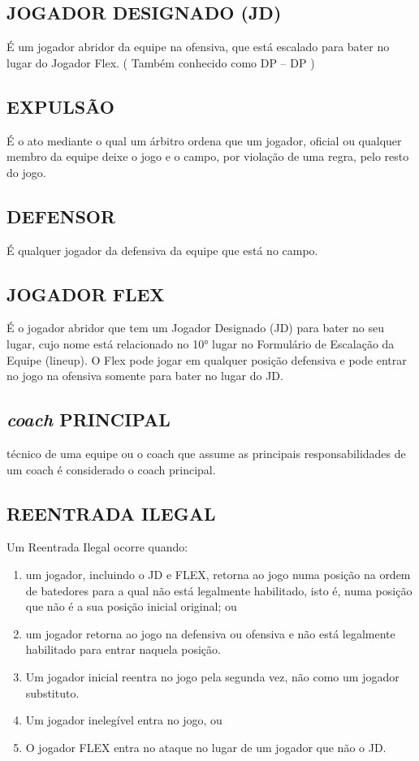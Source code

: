 \subsection{JOGADOR DESIGNADO (JD)}
É um jogador abridor da equipe na ofensiva, que está escalado para bater no lugar do Jogador Flex. ( Também conhecido como DP -- \gls{DP} )

\subsection{EXPULSÃO}
É o ato mediante o qual um árbitro ordena que um jogador, oficial ou qualquer membro da equipe deixe o jogo e o campo, por violação de uma regra, pelo resto do jogo.

\subsection{DEFENSOR}
 É qualquer jogador da defensiva da equipe que está no campo.

 \subsection{JOGADOR FLEX}
 É o jogador abridor que tem um Jogador Designado (JD) para bater no seu lugar, cujo nome está relacionado no 10° lugar no Formulário de Escalação da Equipe (\gls{lineup}). O Flex pode jogar em qualquer posição defensiva e pode entrar no jogo na ofensiva somente para bater no lugar do JD.

\subsection{\textit{coach} PRINCIPAL}
 técnico de uma equipe ou o \gls{coach} que assume as principais responsabilidades de um \gls{coach} é considerado o \gls{coach} principal.
\subsection{REENTRADA ILEGAL}
 Um Reentrada Ilegal ocorre quando:

\begin{enumerate}[label=(\alph*)]\item   um jogador, incluindo o JD e FLEX, retorna ao jogo numa posição na ordem de batedores para a qual não está legalmente habilitado, isto é, numa posição que não é a sua posição inicial original; ou
\item  um jogador retorna ao jogo na defensiva ou ofensiva e não está legalmente habilitado para entrar naquela posição.
\item  Um jogador inicial reentra no jogo pela segunda vez, não como um jogador substituto.
\item  Um jogador inelegível entra no jogo, ou
\item  O jogador FLEX entra no ataque no lugar de um jogador que não o JD.
\end{enumerate}

